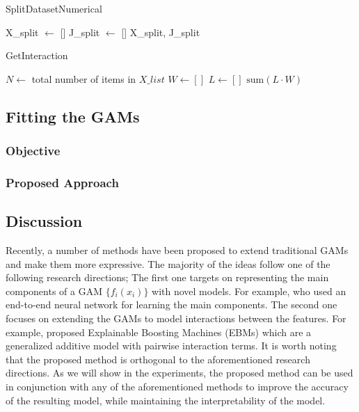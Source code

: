\documentclass[12pt]{article}
\begin{document}
\begin{algorithm}
\caption{SplitDatasetNumerical}
\label{alg:split_dataset_numerical}
\SetAlgoLined
{}
X\_split $\gets$ []\;
J\_split $\gets$ []\;
\Return X\_split, J\_split
\end{algorithm}



\begin{algorithm}
\caption{GetInteraction}
\label{alg:get_interaction}
\SetAlgoLined
{}
$N \gets$ total number of items in $X\_list$\;
$W \gets []$\;
$L \gets []$\;
\Return $\text{sum}(L \cdot W)$\;
\end{algorithm}


\subsection{Fitting the GAMs}

\subsubsection{Objective}

\subsubsection{Proposed Approach}

\subsection{Discussion}

Recently, a number of methods have been proposed to extend traditional GAMs and make them more expressive.
The majority of the ideas follow one of the following research directions;
The first one targets on representing the main components of a GAM $\{ f_i(x_i) \}$ with novel models.
For example, \citet{agarwal2021neural} who used an end-to-end neural network for learning the main components.
The second one focuses on extending the GAMs to model interactions between the features.
For example, \citet{lou2013accurate} proposed Explainable Boosting Machines (EBMs) which are a generalized additive model with pairwise interaction terms.
It is worth noting that the proposed method is orthogonal to the aforementioned research directions.
As we will show in the experiments, the proposed method can be used in conjunction with any of the
aforementioned methods to improve the accuracy of the resulting model, while maintaining the interpretability of the model.
\end{document}
